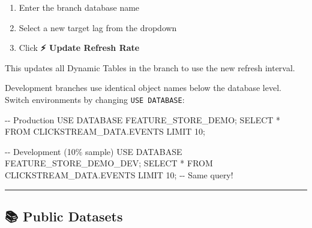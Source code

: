 \documentclass[
  letterpaper,
  DIV=11,
  numbers=noendperiod]{scrreprt}
\newenvironment{Shaded}{\begin{snugshade}}{\end{snugshade}}
\newcommand{\CommentTok}[1]{\textcolor[rgb]{0.37,0.37,0.37}{#1}}
\newcommand{\DecValTok}[1]{\textcolor[rgb]{0.68,0.00,0.00}{#1}}
\newcommand{\KeywordTok}[1]{\textcolor[rgb]{0.00,0.23,0.31}{#1}}
\newcommand{\NormalTok}[1]{\textcolor[rgb]{0.00,0.23,0.31}{#1}}
\newcommand{\OperatorTok}[1]{\textcolor[rgb]{0.37,0.37,0.37}{#1}}
\providecommand{\tightlist}{%
  \setlength{\itemsep}{0pt}\setlength{\parskip}{0pt}}\usepackage{longtable,booktabs,array}
\begin{document}
\begin{enumerate}
\def\labelenumi{\arabic{enumi}.}
\tightlist
\item
  Enter the branch database name
\item
  Select a new target lag from the dropdown
\item
  Click \textbf{⚡ Update Refresh Rate}
\end{enumerate}

This updates all Dynamic Tables in the branch to use the new refresh
interval.

\begin{tcolorbox}[enhanced jigsaw, title=\textcolor{quarto-callout-tip-color}{\faLightbulb}\hspace{0.5em}{Environment Switching}, colbacktitle=quarto-callout-tip-color!10!white, rightrule=.15mm, arc=.35mm, colframe=quarto-callout-tip-color-frame, left=2mm, bottomtitle=1mm, toptitle=1mm, breakable, bottomrule=.15mm, opacityback=0, titlerule=0mm, toprule=.15mm, opacitybacktitle=0.6, colback=white, coltitle=black, leftrule=.75mm]

Development branches use identical object names below the database
level. Switch environments by changing \texttt{USE\ DATABASE}:

\begin{Shaded}
\begin{Highlighting}[]
\CommentTok{{-}{-} Production}
\KeywordTok{USE} \KeywordTok{DATABASE}\NormalTok{ FEATURE\_STORE\_DEMO;}
\KeywordTok{SELECT} \OperatorTok{*} \KeywordTok{FROM}\NormalTok{ CLICKSTREAM\_DATA.}\KeywordTok{EVENTS} \KeywordTok{LIMIT} \DecValTok{10}\NormalTok{;}

\CommentTok{{-}{-} Development (10\% sample)}
\KeywordTok{USE} \KeywordTok{DATABASE}\NormalTok{ FEATURE\_STORE\_DEMO\_DEV;}
\KeywordTok{SELECT} \OperatorTok{*} \KeywordTok{FROM}\NormalTok{ CLICKSTREAM\_DATA.}\KeywordTok{EVENTS} \KeywordTok{LIMIT} \DecValTok{10}\NormalTok{;  }\CommentTok{{-}{-} Same query!}
\end{Highlighting}
\end{Shaded}

\end{tcolorbox}

\begin{center}\rule{0.5\linewidth}{0.5pt}\end{center}

\hypertarget{public-datasets}{%
\subsection{📚 Public Datasets}\label{public-datasets}}
\end{document}
